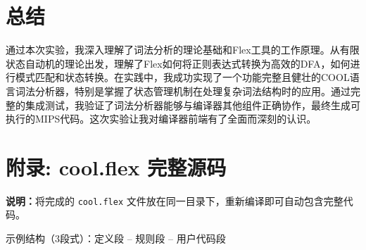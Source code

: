 \documentclass[twocolumn]{article}
\begin{document}
\section{总结}
通过本次实验，我深入理解了词法分析的理论基础和Flex工具的工作原理。从有限状态自动机的理论出发，理解了Flex如何将正则表达式转换为高效的DFA，如何进行模式匹配和状态转换。在实践中，我成功实现了一个功能完整且健壮的COOL语言词法分析器，特别是掌握了状态管理机制在处理复杂词法结构时的应用。通过完整的集成测试，我验证了词法分析器能够与编译器其他组件正确协作，最终生成可执行的MIPS代码。这次实验让我对编译器前端有了全面而深刻的认识。

\textcolor{red}{%
}

\appendix
\section{附录: cool.flex 完整源码}
\label{sec:appendix_code}

\textcolor{red}{%
}

  {}
  {
\textbf{说明：}将完成的 \texttt{cool.flex} 文件放在同一目录下，重新编译即可自动包含完整代码。

示例结构（3段式）：定义段 -- 规则段 -- 用户代码段
}
\end{document}
